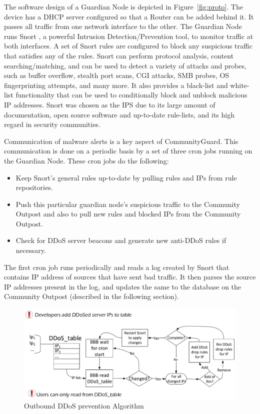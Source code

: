 The software design of a Guardian Node is depicted in Figure~\ref{fig:proto}. The device has a DHCP server configured so that a Router can be added behind it. It passes all traffic from one network interface to the other. The Guardian Node runs Snort \cite{Roesch:1999:SLI:1039834.1039864}, a powerful Intrusion Detection/Prevention tool, to monitor traffic at both interfaces. A set of Snort rules are configured to block any suspicious traffic that satisfies any of the rules. Snort can perform protocol analysis, content searching/matching, and can be used to detect a variety of attacks and probes, such as buffer overflow, stealth port scans, CGI attacks, SMB probes, OS fingerprinting attempts, and many more. It also provides a black-list and white-list functionality that can be used to conditionally block and unblock malicious IP addresses. Snort was chosen as the IPS due to its large amount of documentation, open source software and up-to-date rule-lists, and its high regard in security communities.

Communication of malware alerts is a key aspect of CommunityGuard. This communication is done on a periodic basis by a set of three cron jobs running on the Guardian Node. These cron jobs do the following:

\begin{itemize}
    \item Keep Snort's general rules up-to-date by pulling rules and IPs from rule repositories.
    \item Push this particular guardian node's suspicious traffic to the Community Outpost and also to pull new rules and blocked IPs from the Community Outpost.
    \item Check for DDoS server beacons and generate new anti-DDoS rules if necessary.
\end{itemize}

The first cron job runs periodically and reads a log created by Snort that contains IP address of sources that have sent bad traffic. It then parses the source IP addresses present in the log, and updates the same to the database on the Community Outpost (described in the following section).

\begin{figure}
    \centering
    \includegraphics[width=0.95\columnwidth]{figs/ddosserv.pdf}
    \caption{Outbound DDoS prevention Algorithm}
    \label{fig:ddostable}
\end{figure}



